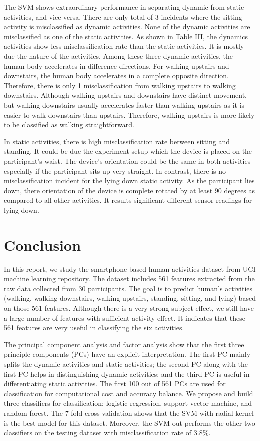 \documentclass[conference]{IEEEtran}
\begin{document}
The SVM shows extraordinary performance in separating dynamic from static activities, and vice versa. There are only total of 3 incidents where the sitting activity is misclassified as dynamic activities. None of the dynamic activities are misclassified as one of the static activities. As shown in Table III, the dynamics activities show less misclassification rate than the static activities. It is mostly due the nature of the activities. Among these three dynamic activities, the human body accelerates in difference directions. For walking upstairs and downstairs, the human body accelerates in a complete opposite direction. Therefore, there is only 1 misclassification from walking upstairs to walking downstairs. Although walking upstairs and downstairs have distinct movement, but walking downstairs usually accelerates faster than walking upstairs as it is easier to walk downstairs than upstairs. Therefore, walking upstairs is more likely to be classified as walking straightforward. 

In static activities, there is high misclassification rate between sitting and standing. It could be due the experiment setup which the device is placed on the participant's waist. The device's orientation could be the same in both activities especially if the participant sits up very straight. In contrast, there is no misclassification incident for the lying down static activity. As the participant lies down, there orientation of the device is complete rotated by at least 90 degrees as compared to all other activities. It results significant different sensor readings for lying down.

\section{Conclusion}  
In this report, we study the smartphone based human activities dataset from UCI machine learning repository. The dataset includes 561 features extracted from the raw data collected from 30 participants. The goal is to predict human's activities (walking, walking downstairs, walking upstairs, standing, sitting, and lying) based on those 561 features. Although there is a very strong subject effect, we still have a large number of features with sufficient activity effect. It indicates that these 561 features are very useful in classifying the six activities. 

The principal component analysis and factor analysis show that the first three principle components (PCs) have an explicit interpretation. The first PC mainly splits the dynamic activities and static activities; the second PC along with the first PC helps in distinguishing dynamic activities; and the third PC is useful in differentiating static activities. The first 100 out of 561 PCs are used for classification for computational cost and accuracy balance. We propose and build three classifiers for classification: logistic regression, support vector machine, and random forest. The 7-fold cross validation shows that the SVM with radial kernel is the best model for this dataset.  Moreover, the SVM out performs the other two classifiers on the testing dataset with misclassification rate of $3.8\%$.




\end{document}
